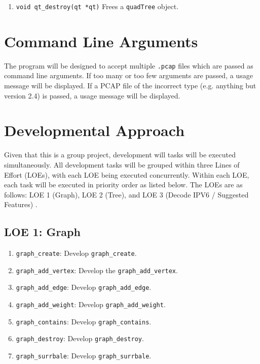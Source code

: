 \documentclass[12pt]{article}
\begin{document}
{{{\begin{enumerate}
\item \lstinline|void qt_destroy(qt *qt)|
\newline
Frees a \lstinline|quadTree| object.

\newline
\end{enumerate}

\section {Command Line Arguments}
	The program will be designed to accept multiple \lstinline|.pcap| files which are passed as command line arguments. If too many or too few arguments are passed, a usage message will be displayed. If a PCAP file of the incorrect type (e.g. anything but version 2.4) is passed, a usage message will be displayed.

\section{Developmental Approach}
Given that this is a group project, development will tasks will be executed simultaneously. All development tasks will be grouped within three Lines of Effort (LOEs), with each LOE being executed concurrently. Within each LOE, each task will be executed in priority order as listed below. The LOEs are as follows: LOE 1 (Graph), LOE 2 (Tree), and LOE 3 (Decode IPV6 / Suggested Features) . 
\subsection{LOE 1: Graph}
\hspace{8pt}
\begin{enumerate}
    \item \lstinline|graph_create|:
        Develop \lstinline|graph_create|.
    \item \lstinline|graph_add_vertex|:
        Develop the \lstinline|graph_add_vertex|.
    \item \lstinline|graph_add_edge|: 
        Develop \lstinline|graph_add_edge|.
    \item \lstinline|graph_add_weight|:
        Develop \lstinline|graph_add_weight|.
    \item \lstinline|graph_contains|:
        Develop \lstinline|graph_contains|.
    \item \lstinline|graph_destroy|: 
        Develop \lstinline|graph_destroy|.
    \item \lstinline|graph_surrbale|: 
        Develop \lstinline|graph_surrbale|.
\end{enumerate}
}}}
\end{document}
